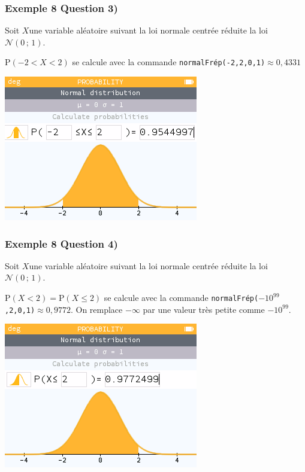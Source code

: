 \documentclass[xcolor=svgnames,t,final]{beamer}
\begin{document}
\begin{frame}
\frametitle{Exemple 8 Question 3)}


Soit  $X $une variable aléatoire suivant la loi normale centrée réduite la loi $\mathcal{N}\left(0 \, ; \, 1\right)$.


 $\text{P}\left( -2<X<2 \right)$   se calcule avec la commande \texttt{normalFrép(-2,2,0,1)}$\approx  0,4331$


\begin{center}
\includegraphics[scale=0.3]{images/exemple8-fig3.png}
\end{center}

\end{frame}

\begin{frame}
\frametitle{Exemple 8 Question 4)}


Soit  $X $une variable aléatoire suivant la loi normale centrée réduite la loi $\mathcal{N}\left(0 \, ; \, 1\right)$.


 $\text{P}\left(  X  < 2  \right)=\text{P}\left(  X  \leqslant 2  \right)$  se calcule avec la commande \texttt{normalFrép($-10^{99}$,2,0,1)}$\approx  0,9772$. On remplace $-\infty$ par une valeur très petite comme $-10^{99}$.



\begin{center}
\includegraphics[scale=0.3]{images/exemple8-fig4.png}
\end{center}

\end{frame}
\end{document}
